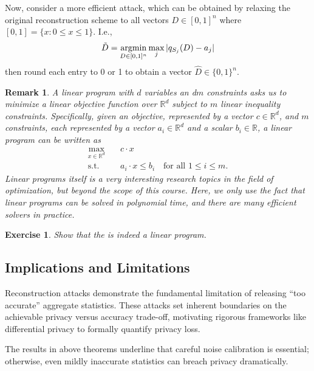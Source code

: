 \documentclass[11pt, a4paper]{article}
\newtheorem{exercise}{Exercise}
\newtheorem{remark}{Remark}
\begin{document}
Now, consider a more efficient attack, which can be obtained by relaxing the original reconstruction scheme to all vectors $D\in[0, 1]^n$ where $[0, 1] = \{x:0\leq x\leq 1\}$.
I.e.,
\begin{align}
    \tilde{D} = \mathop{\mbox{{\rm argmin}}}\limits_{D\in[0, 1]^n} \max_j |q_{S_j}(D) - a_j|\label{eq:lp}
\end{align}
then round each entry to 0 or 1 to obtain a vector $\hat{D} \in \{0, 1\}^n$.

\begin{remark}
    A linear program with $d$ variables an d$m$ constraints asks us to minimize a linear objective function over $\mathbb{R}^d$ subject to $m$ linear inequality constraints.
    Specifically, given an objective, represented by a vector $c\in\mathbb{R}^d$, and $m$ constraints, each represented by a vector $a_i\in \mathbb{R}^d$ and a scalar $b_i\in\mathbb{R}$,
    a linear program can be written as
    \begin{align}
        \max_{x\in\mathbb{R}^d} &\quad c\cdot x\\
        \textrm{s.t.}             &\quad a_i\cdot x \leq b_i \quad\mbox{for all $1\leq i\leq m$}.
    \end{align}
    Linear programs itself is a very interesting research topics in the field of optimization, but beyond the scope of this course.
    Here, we only use the fact that linear programs can be solved in polynomial time, and there are many efficient solvers in practice. 
\end{remark}

\begin{exercise}
    Show that the  is indeed a linear program.
\end{exercise}




\subsection{Implications and Limitations}

Reconstruction attacks demonstrate the fundamental limitation of releasing ``too accurate'' aggregate statistics.
These attacks set inherent boundaries on the achievable privacy versus accuracy trade-off,
motivating rigorous frameworks like differential privacy to formally quantify privacy loss.

The results in above theorems underline that careful noise calibration is essential;
otherwise, even mildly inaccurate statistics can breach privacy dramatically.
\end{document}
